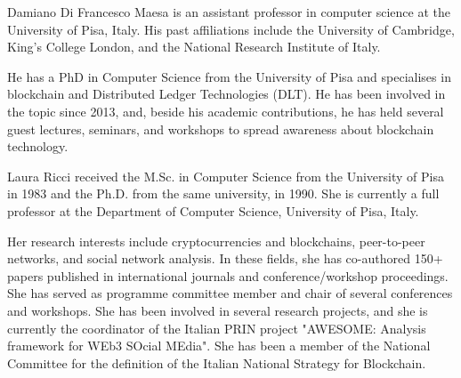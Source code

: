 \documentclass{ieeeaccess}
\begin{document}
\begin{IEEEbiography}{Damiano Di Francesco Maesa} is an assistant professor in computer science at the University of Pisa, Italy. His past affiliations include the University of Cambridge, King's College London, and the National Research Institute of Italy.
    \par
    He has a PhD in Computer Science from the University of Pisa and specialises in
    blockchain and Distributed Ledger Technologies (DLT). He has been involved in
    the topic since 2013, and, beside his academic contributions, he has held
    several guest lectures, seminars, and workshops to spread awareness about
    blockchain technology.
\end{IEEEbiography}

\begin{IEEEbiography}{Laura Ricci} received the M.Sc. in Computer Science from the University of Pisa in 1983 and the Ph.D. from the same university, in 1990. She is currently a full professor at the Department of Computer Science, University of Pisa, Italy.
    \par
    Her research interests include cryptocurrencies and blockchains, peer-to-peer
    networks, and social network analysis. In these fields, she has co-authored
    150+ papers published in international journals and conference/workshop
    proceedings. She has served as programme committee member and chair of several
    conferences and workshops. She has been involved in several research projects,
    and she is currently the coordinator of the Italian PRIN project "AWESOME:
    Analysis framework for WEb3 SOcial MEdia". She has been a member of the
    National Committee for the definition of the Italian National Strategy for
    Blockchain.
\end{IEEEbiography}

\EOD
\end{document}
